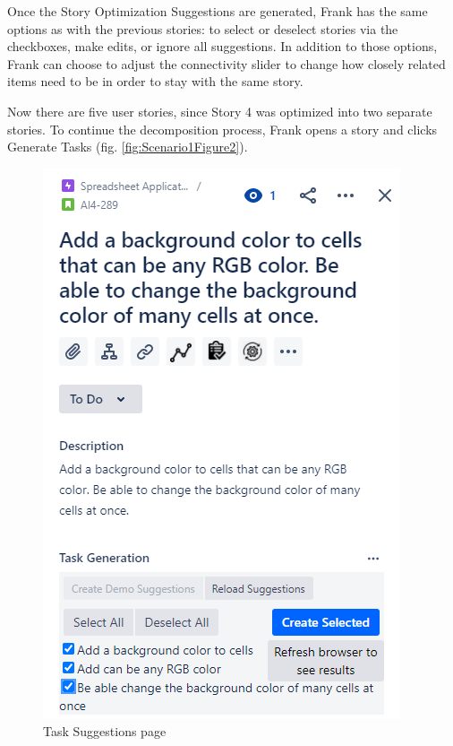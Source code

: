 Once the Story Optimization Suggestions are generated, Frank has the same options as with the previous stories: to select or deselect stories via the checkboxes, make edits, or ignore all suggestions. In addition to those options, Frank can choose to adjust the connectivity slider to change how closely related items need to be in order to stay with the same story.  

Now there are five user stories, since Story 4 was optimized into two separate stories. To continue the decomposition process, Frank opens a story and clicks Generate Tasks (fig. \ref{fig:Scenario1Figure2}).

\begin{figure}
\centerline{\includegraphics[width=\textwidth,height=\textheight,keepaspectratio]{./figure/Scenario1Figure4.png}}
\caption{Task Suggestions page}
\label{fig:Scenario1Figure4}
\end{figure}

